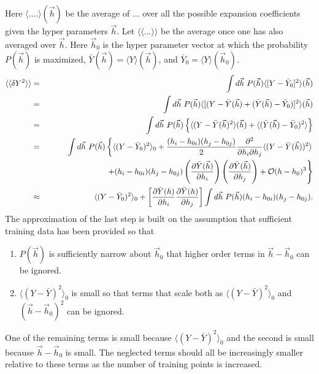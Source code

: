 \documentclass[12pt]{article}
\numberwithin{equation}{section}
\numberwithin{figure}{section}
\begin{document}
Here $\langle ....\rangle(\vec{h})$ be the average of $...$ over all the possible expansion coefficients given the hyper parameters $\vec{h}$.
Let $\langle\langle ...\rangle\rangle$ be the average once one has also averaged over $\vec{h}$. Here $\vec{h}_0$ is the hyper parameter vector at which the probability $P(\vec{h})$ is maximized, $\bar{Y}(\vec{h})=\langle Y\rangle(\vec{h})$, and $\bar{Y}_0=\langle Y\rangle(\vec{h}_0)$.
\begin{eqnarray*}
\langle\langle \delta Y^2\rangle\rangle &=&
\int d\vec{h}~P(\vec{h}) \langle [Y-\bar{Y}_0]^2\rangle(\vec{h})\\
&=&\int d\vec{h}~P(\vec{h}) \langle [(Y-\bar{Y}(\vec{h})+(\bar{Y}(\vec{h})-\bar{Y}_0)]^2\rangle(\vec{h})\\
&=&\int d\vec{h}~P(\vec{h})\left\{
\langle(Y-\bar{Y}(\vec{h})^2\rangle(\vec{h})+\langle(\bar{Y}(\vec{h})-\bar{Y}_0)^2\rangle
\right\}\\
&=&\int d\vec{h}~P(\vec{h})\left\{\langle(Y-\bar{Y}_0)^2\rangle_0
+\frac{(h_i-h_{0i})(h_j-h_{0j})}{2}\frac{\partial^2}{\partial h_i\partial h_j}\langle(Y-\bar{Y}(\vec{h}))^2\rangle\right.\\
&&\hspace*{75pt}\left.+(h_i-h_{0i})(h_j-h_{0j})\left(\frac{\partial\bar{Y}(\vec{h})}{\partial h_i}\right)\left(\frac{\partial\bar{Y}(\vec{h})}{\partial h_j}\right)+\mathcal{O}(h-h_0)^3
\right\}\\
&\approx&\langle(Y-\bar{Y}_0)^2\rangle_0
+\left[\frac{\partial\bar{Y}(h)}{\partial h_i}\frac{\partial\bar{Y}(h)}{\partial h_j}\right]\int d\vec{h}~P(\vec{h})(h_i-h_{0i})(h_j-h_{0j}).
\end{eqnarray*}
The approximation of the last step is built on the assumption that sufficient training data has been provided so that 
\begin{enumerate}\itemsep=0pt
\item $P(\vec{h})$ is sufficiently narrow about $\vec{h}_0$ that higher order terms in $\vec{h}-\vec{h}_0$ can be ignored.
\item $\langle (Y-\bar{Y})^2\rangle_0$ is small so that terms that scale both as $\langle (Y-\bar{Y})^2\rangle_0$ and $(\vec{h}-\vec{h}_0)^2$ can be ignored.
\end{enumerate}
One of the remaining terms is small because $\langle (Y-\bar{Y})^2\rangle_0$ and the second is small because $\vec{h}-\vec{h}_0$ is small. The neglected terms should all be increasingly smaller relative to these terms as the number of training points is increased.
\end{document}
